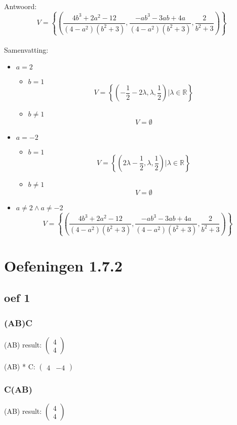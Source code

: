 \documentclass[10pt,a4paper]{article}
\begin{document}
Antwoord:
\[
V = \left\lbrace\left(\frac{4b^{3}+2a^{2}-12}{(4-a^{2})(b^{2}+3)},\frac{-ab^{3}-3ab+4a}{(4-a^{2})(b^{2}+3)},\frac{2}{b^{2}+3}\right)\right\rbrace
\]
\\Samenvatting:
\begin{itemize}
\item $a=2$
\begin{itemize}
\item $b=1$
\[
V = \left\lbrace \left(-\frac{1}{2}-2\lambda,\lambda,\frac{1}{2}\right)| \lambda \in \mathbb{R}\right\rbrace
\]
\item $b\neq 1$
\[
V = \emptyset
\]
\end{itemize}
\item $a=-2$
\begin{itemize}
\item $b=1$
\[
V= \left\lbrace \left(2\lambda-\frac{1}{2},\lambda,\frac{1}{2}\right)| \lambda \in \mathbb{R}\right\rbrace
\]
\item $b\neq 1$
\[
V= \emptyset
\]
\end{itemize}
\item $a\neq 2 \wedge a \neq -2$ 
\[
V = \left\lbrace\left(\frac{4b^{3}+2a^{2}-12}{(4-a^{2})(b^{2}+3)},\frac{-ab^{3}-3ab+4a}{(4-a^{2})(b^{2}+3)},\frac{2}{b^{2}+3}\right)\right\rbrace
\]
\end{itemize}
\section{Oefeningen 1.7.2}

\subsection*{oef 1}
\subsubsection*{(AB)C}
(AB) result:
$
\begin{pmatrix}

4\\
4

\end{pmatrix}
$

(AB) * C:
$
\begin{pmatrix}
4 & -4
\end{pmatrix}
$

\subsubsection*{C(AB)}
(AB) result:
$
\begin{pmatrix}
4\\
4
\end{pmatrix}
$
\end{document}
